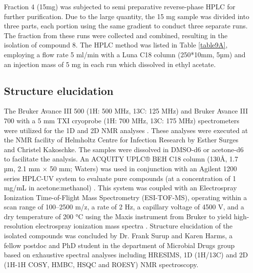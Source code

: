 Fraction 4 (15mg) was subjected to semi preparative reverse-phase HPLC for further purification. Due to the large quantity, the 15 mg sample was divided into three parts, each portion using the same gradient to conduct three separate runs. The fraction from these runs were collected and combined, resulting in the isolation of compound 8. The HPLC method was listed in  Table \ref{table9A}, employing a flow rate 5 ml/min with a Luna C18 column (250*10mm, 5µm) and an injection mass of 5 mg in each run which dissolved in ethyl acetate.


\subsection{Structure elucidation}
The Bruker Avance III 500 (1H: 500 MHz, 13C: 125 MHz) and Bruker Avance III 700 with a 5 mm TXI cryoprobe (1H: 700 MHz, 13C: 175 MHz) spectrometers were utilized for the 1D and 2D NMR analyses \cite{Ellens}. These analyses were executed at the NMR facility of Helmholtz Centre for Infection Research by Esther Surges and Christel Kakoschke. The samples were dissolved in DMSO-d6 or acetone-d6 to facilitate the analysis. An ACQUITY UPLC® BEH C18 column (130Å, 1.7 µm, 2.1 mm × 50 mm; Waters) was used in conjunction with an Agilent 1200 series HPLC-UV system to evaluate pure compounds (at a concentration of 1 mg/mL in acetone:methanol) \cite{Ellens}. This system was coupled with an Electrospray Ionization Time-of-Flight Mass Spectrometry (ESI-TOF-MS), operating within a scan range of 100–2500 m/z, a rate of 2 Hz, a capillary voltage of 4500 V, and a dry temperature of 200 °C using the Maxis instrument from Bruker to yield high-resolution electrospray ionization mass spectra \cite{Ellens}. Structure elucidation of the isolated compounds was concluded by Dr. Frank Surup and Karen Harms, a fellow postdoc and PhD student in the department of Microbial Drugs group based on exhaustive spectral analyses including HRESIMS, 1D (1H/13C) and 2D (1H-1H COSY, HMBC, HSQC and ROESY) NMR spectroscopy.


